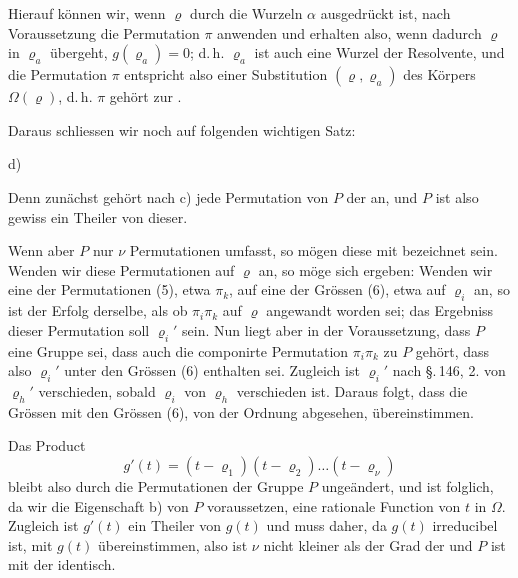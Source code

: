 
Hierauf können wir, wenn $\varrho$ durch die Wurzeln $\alpha$ ausgedrückt ist, nach Voraussetzung die Permutation $\pi$ anwenden und erhalten also, wenn dadurch $\varrho$ in $\varrho_a$ übergeht, $g(\varrho_a) = 0$; d.\,h. $\varrho_a$ ist auch eine Wurzel der Resolvente, und die Permutation $\pi$ entspricht also einer Substitution $(\varrho, \varrho_a)$ des Körpers $\Omega(\varrho)$, d.\,h. $\pi$ gehört zur .

Daraus schliessen wir noch auf folgenden wichtigen Satz:

d) 

Denn zunächst gehört nach c) jede Permutation von $P$ der  an, und $P$ ist also gewiss ein Theiler von dieser.

Wenn aber $P$ nur $\nu$ Permutationen umfasst, so mögen diese mit
bezeichnet sein. Wenden wir diese Permutationen auf $\varrho$ an, so möge sich ergeben:
Wenden wir eine der Permutationen (5), etwa $\pi_k$, auf eine der Grössen (6), etwa auf $\varrho_i$ an, so ist der Erfolg derselbe, als ob $\pi_i \pi_k$ auf $\varrho$ angewandt worden sei; das Ergebniss dieser Permutation soll $\varrho_i'$ sein. Nun liegt aber in der Voraussetzung, dass $P$ eine Gruppe sei, dass auch die componirte Permutation $\pi_i \pi_k$ zu $P$ gehört, dass also $\varrho_i'$ unter den Grössen (6) enthalten sei. Zugleich ist $\varrho_i'$ nach \S.\,146, 2. von $\varrho_h'$ verschieden, sobald $\varrho_i$ von $\varrho_h$ verschieden ist. Daraus folgt, dass die Grössen
mit den Grössen (6), von der Ordnung abgesehen, übereinstimmen.

Das Product
\[
g'(t) = (t - \varrho_1)(t - \varrho_2) \ldots (t - \varrho_\nu)
\]
bleibt also durch die Permutationen der Gruppe $P$ ungeändert, und ist folglich, da wir die Eigenschaft b) von $P$ voraussetzen, eine rationale Function von $t$ in $\Omega$. Zugleich ist $g'(t)$ ein Theiler von $g(t)$ und muss daher, da $g(t)$ irreducibel ist, mit $g(t)$ übereinstimmen, also ist $\nu$ nicht kleiner als der Grad der  und $P$ ist mit der  identisch.
